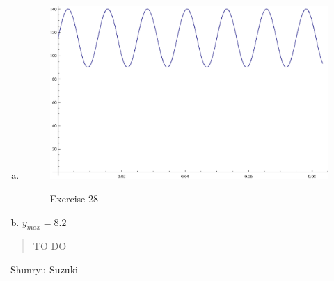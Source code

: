 \documentclass{exam}
\begin{document}
\begin{description}
\begin{enumerate}[(a)]
          \item 
            \begin{figure}[H]
              \centering
              \includegraphics{exercise28.eps}

              Exercise 28
            \end{figure}

          \item $y_{max} = \boxed{ 8.2 }$

        \end{enumerate}

    \end{description}

  \else
    \vspace{1 cm}
    \begin{quote}
      \begin{em}
        TO DO
      \end{em}
    \end{quote}
    \hspace{1 cm} --Shunryu Suzuki
  \fi
\end{document}
